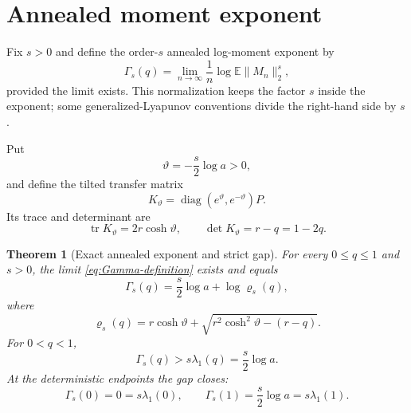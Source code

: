 \documentclass[11pt,a4paper]{amsart}
\newtheorem{theorem}{Theorem}[section]
\theoremstyle{definition}
\theoremstyle{remark}
\newcommand{\Exp}{\mathbb E}
\newcommand{\diag}{\operatorname{diag}}
\newcommand{\norm}[1]{\lVert #1\rVert}
\begin{document}
\section{Annealed moment exponent}
\label{sec:annealed}

Fix $s>0$ and define the order-$s$ annealed log-moment exponent by
\begin{equation}\label{eq:Gamma-definition}
 \Gamma_s(q)=\lim_{n\to\infty}\frac1n
 \log\Exp\norm{M_n}_2^s,
\end{equation}
provided the limit exists.  This normalization keeps the factor $s$
inside the exponent; some generalized-Lyapunov conventions divide the
right-hand side by $s$.

Put
\begin{equation}\label{eq:theta}
 \vartheta=-\frac{s}{2}\log a>0,
\end{equation}
and define the tilted transfer matrix
\begin{equation}\label{eq:tilted}
 K_{\vartheta}
 =\diag(e^{\vartheta},e^{-\vartheta})P.
\end{equation}
Its trace and determinant are
\begin{equation}\label{eq:trace-det}
 \operatorname{tr}K_{\vartheta}=2r\cosh\vartheta,
 \qquad \det K_{\vartheta}=r-q=1-2q.
\end{equation}

\begin{theorem}[Exact annealed exponent and strict gap]
\label{thm:annealed}
For every $0\leq q\leq1$ and $s>0$, the limit
\eqref{eq:Gamma-definition} exists and equals
\begin{equation}\label{eq:annealed-formula}
 \boxed{\quad
 \Gamma_s(q)=\frac{s}{2}\log a+\log\varrho_s(q),
 \quad}
\end{equation}
where
\begin{equation}\label{eq:perron-root}
 \varrho_s(q)=
 r\cosh\vartheta+
 \sqrt{r^2\cosh^2\vartheta-(r-q)}.
\end{equation}
For $0<q<1$,
\begin{equation}\label{eq:strict-gap}
 \Gamma_s(q)>s\lambda_1(q)=\frac{s}{2}\log a.
\end{equation}
At the deterministic endpoints the gap closes:
\begin{equation}\label{eq:endpoint-moments}
 \Gamma_s(0)=0=s\lambda_1(0),\qquad
 \Gamma_s(1)=\frac{s}{2}\log a=s\lambda_1(1).
\end{equation}
\end{theorem}
\end{document}
